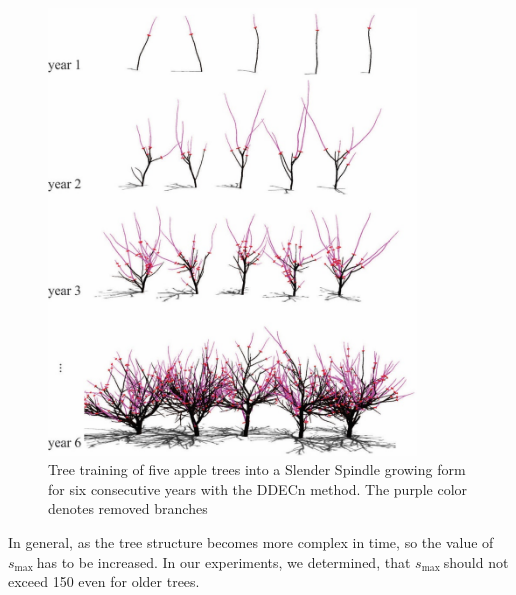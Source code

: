 \begin{figure}[hbt]
    \centering
    \includegraphics[width=3.84333in,height=4.66333in]{figs/image7.jpeg}
    \caption{Tree training of five apple trees into a Slender
Spindle growing form for six consecutive years with the DDECn method.
The purple color denotes removed branches}
    \label{fig:my_figure7}
\end{figure}


In general, as the tree structure becomes more complex in time, so the
value of \(s_{\mathrm{\max}}\ \)has to be increased. In our experiments,
we determined, that \(s_{\mathrm{\max}}\ \)should not exceed 150 even
for older trees.
